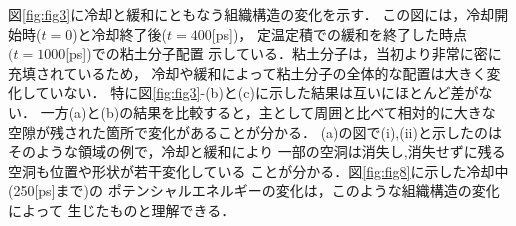 図\ref{fig:fig3}に冷却と緩和にともなう組織構造の変化を示す．
この図には，冷却開始時($t=0$)と冷却終了後($t=400$[ps])，
定温定積での緩和を終了した時点$(t=1000$[ps])での粘土分子配置
示している．粘土分子は，当初より非常に密に充填されているため，
冷却や緩和によって粘土分子の全体的な配置は大きく変化していない．
特に図\ref{fig:fig3}-(b)と(c)に示した結果は互いにほとんど差がない．
一方(a)と(b)の結果を比較すると，主として周囲と比べて相対的に大きな
空隙が残された箇所で変化があることが分かる．
(a)の図で(i),(ii)と示したのはそのような領域の例で，冷却と緩和により
一部の空洞は消失し,消失せずに残る空洞も位置や形状が若干変化している
ことが分かる．図\ref{fig:fig8}に示した冷却中(250[ps]まで)の
ポテンシャルエネルギーの変化は，このような組織構造の変化によって
生じたものと理解できる．

